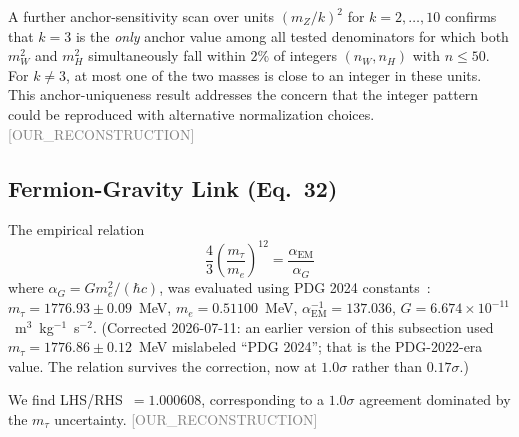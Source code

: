 \documentclass[twocolumn,prd,amsmath,amssymb,floatfix]{revtex4-2}
\newcommand{\reconstruction}{\textcolor{gray}{\small[OUR\_RECONSTRUCTION]}}
\begin{document}
A further anchor-sensitivity scan over units $(m_Z/k)^2$ for $k = 2, \ldots, 10$
confirms that $k=3$ is the \emph{only} anchor value among all tested denominators
for which both $m_W^2$ and $m_H^2$ simultaneously fall within $2\%$ of integers
$(n_W, n_H)$ with $n \le 50$.
For $k \ne 3$, at most one of the two masses is close to an integer in these units.
This anchor-uniqueness result addresses the concern that the integer pattern could be
reproduced with alternative normalization choices.\reconstruction

\subsection{Fermion-Gravity Link (Eq.~32)}
\label{ssec:eq32}

The empirical relation
\begin{equation}
    \frac{4}{3}\left(\frac{m_\tau}{m_e}\right)^{12} = \frac{\alpha_\mathrm{EM}}{\alpha_G}
    \label{eq:c9}
\end{equation}
where $\alpha_G = G m_e^2 / (\hbar c)$, was evaluated using PDG 2024
constants~\cite{pdg2024}: $m_\tau = 1776.93 \pm 0.09$~MeV, $m_e = 0.51100$~MeV,
$\alpha_\mathrm{EM}^{-1} = 137.036$, $G = 6.674 \times 10^{-11}$~m$^3$~kg$^{-1}$~s$^{-2}$.
(Corrected 2026-07-11: an earlier version of this subsection used
$m_\tau = 1776.86 \pm 0.12$~MeV mislabeled ``PDG 2024''; that is the
PDG-2022-era value. The relation survives the correction, now at
$1.0\sigma$ rather than $0.17\sigma$.)

We find LHS/RHS~$= 1.000608$, corresponding to a $1.0\sigma$ agreement
dominated by the $m_\tau$ uncertainty.
\reconstruction
\end{document}
